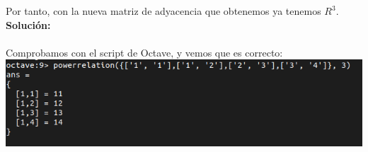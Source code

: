 \documentclass[12pt]{article}
\begin{document}
Por tanto, con la nueva matriz de adyacencia que obtenemos ya tenemos $R^3$.\\
\textbf{Solución: }\\ \\ 
Comprobamos con el script de Octave, y vemos que es correcto:\\ 

\includegraphics[width=15cm]{img1.png}
\end{document}
